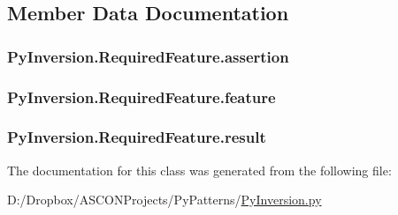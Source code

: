 \subsection{Member Data Documentation}
\hypertarget{class_py_inversion_1_1_required_feature_aa20d4e8ea16793c413631def7daf0caf}{
\subsubsection[{assertion}]{\setlength{\rightskip}{0pt plus 5cm}Py\+Inversion.\+Required\+Feature.\+assertion}}\label{class_py_inversion_1_1_required_feature_aa20d4e8ea16793c413631def7daf0caf}
\hypertarget{class_py_inversion_1_1_required_feature_a9d27890fe52489cae6ba6e692e856c33}{
\subsubsection[{feature}]{\setlength{\rightskip}{0pt plus 5cm}Py\+Inversion.\+Required\+Feature.\+feature}}\label{class_py_inversion_1_1_required_feature_a9d27890fe52489cae6ba6e692e856c33}
\hypertarget{class_py_inversion_1_1_required_feature_a3cc2960e714d44ebf6c440ff99aedbf5}{
\subsubsection[{result}]{\setlength{\rightskip}{0pt plus 5cm}Py\+Inversion.\+Required\+Feature.\+result}}\label{class_py_inversion_1_1_required_feature_a3cc2960e714d44ebf6c440ff99aedbf5}


The documentation for this class was generated from the following file\+:\begin{DoxyCompactItemize}
\item 
D\+:/\+Dropbox/\+A\+S\+C\+O\+N\+Projects/\+Py\+Patterns/\hyperlink{_py_inversion_8py}{Py\+Inversion.\+py}\end{DoxyCompactItemize}

